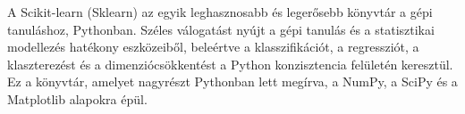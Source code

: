 
A Scikit-learn (Sklearn) az egyik leghasznosabb és legerősebb könyvtár a gépi tanuláshoz, Pythonban. Széles válogatást nyújt a gépi tanulás és a statisztikai modellezés hatékony eszközeiből, beleértve a klasszifikációt, a regressziót, a klaszterezést és a dimenziócsökkentést a Python konzisztencia felületén keresztül. Ez a könyvtár, amelyet nagyrészt Pythonban lett megírva, a NumPy, a SciPy és a Matplotlib alapokra épül.
